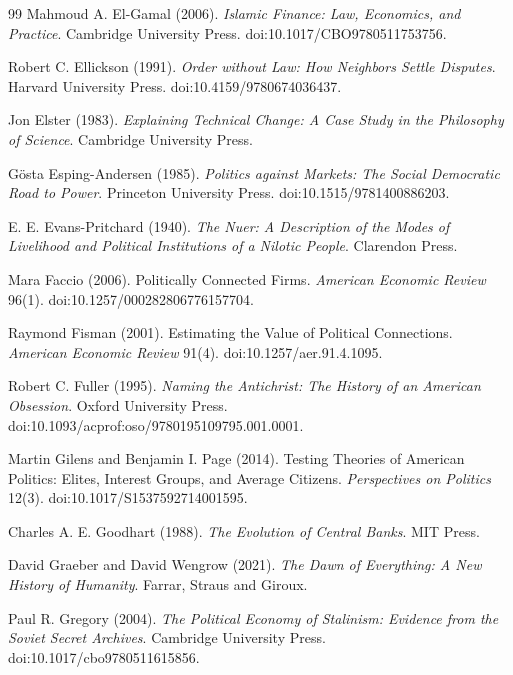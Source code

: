 \documentclass[11pt,letterpaper]{article}
\theoremstyle{definition}
\theoremstyle{remark}
\begin{document}
\begin{thebibliography}{99}
Mahmoud A. El-Gamal (2006). \emph{Islamic Finance: Law, Economics, and Practice}. Cambridge University Press. doi:10.1017/CBO9780511753756.

Robert C. Ellickson (1991). \emph{Order without Law: How Neighbors Settle Disputes}. Harvard University Press. doi:10.4159/9780674036437.

Jon Elster (1983). \emph{Explaining Technical Change: A Case Study in the Philosophy of Science}. Cambridge University Press.

G\"osta Esping-Andersen (1985). \emph{Politics against Markets: The Social Democratic Road to Power}. Princeton University Press. doi:10.1515/9781400886203.

E. E. Evans-Pritchard (1940). \emph{The Nuer: A Description of the Modes of Livelihood and Political Institutions of a Nilotic People}. Clarendon Press.

Mara Faccio (2006). Politically Connected Firms. \emph{American Economic Review} 96(1). doi:10.1257/000282806776157704.

Raymond Fisman (2001). Estimating the Value of Political Connections. \emph{American Economic Review} 91(4). doi:10.1257/aer.91.4.1095.

Robert C. Fuller (1995). \emph{Naming the Antichrist: The History of an American Obsession}. Oxford University Press. doi:10.1093/acprof:oso/9780195109795.001.0001.

Martin Gilens and Benjamin I. Page (2014). Testing Theories of American Politics: Elites, Interest Groups, and Average Citizens. \emph{Perspectives on Politics} 12(3). doi:10.1017/S1537592714001595.

Charles A. E. Goodhart (1988). \emph{The Evolution of Central Banks}. MIT Press.

David Graeber and David Wengrow (2021). \emph{The Dawn of Everything: A New History of Humanity}. Farrar, Straus and Giroux.

Paul R. Gregory (2004). \emph{The Political Economy of Stalinism: Evidence from the Soviet Secret Archives}. Cambridge University Press. doi:10.1017/cbo9780511615856.


\end{thebibliography}
\end{document}
